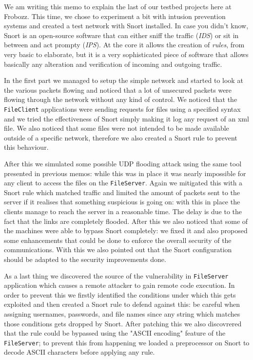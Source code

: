 \documentclass[paper=a4]{../../_global/texMemo}
\begin{document}
\maketitle

We am writing this memo to explain the last of our testbed projects here at Frobozz. This time, we chose to experiment a bit with intusion prevention systems and created a test network with Snort installed. In case you didn't know, Snort is an open-source software that can either sniff the traffic (\textit{IDS}) or sit in between and act prompty (\textit{IPS}). At the core it allows the creation of \textit{rules}, from very basic to elaborate, but it is a very sophisticated piece of software that allows basically any alteration and verification of incoming and outgoing traffic.

In the first part we managed to setup the simple network and started to look at the various packets flowing and noticed that a lot of unsecured packets were flowing through the network without any kind of control.
We noticed that the \texttt{FileClient} applications were sending requests for files using a specified syntax and we tried the effectiveness of Snort simply making it log any request of an xml file. We also noticed that some files were not intended to be made available outside of a specific network, therefore we also created a Snort rule to prevent this behaviour.

After this we simulated some possible UDP flooding attack using the same tool presented in previous memos: while this was in place it was nearly impossible for any client to access the files on the \texttt{FileServer}.
Again we mitigated this with a Snort rule which matched traffic and limited the amount of packets sent to the server if it realises that something suspicious is going on: with this in place the clients manage to reach the server in a reasonable time. The delay is due to the fact that the links are completely flooded.
After this we also noticed that some of the machines were able to bypass Snort completely: we fixed it and also proposed some enhancements that could be done to enforce the overall security of the communications. With this we also pointed out that the Snort configuration should be adapted to the security improvements done.

As a last thing we discovered the source of the vulnerability in \texttt{FileServer} application which causes a remote attacker to gain remote code execution. In order to prevent this we firstly identified the conditions under which this gets exploited and then created a Snort rule to defend against this: be careful when assigning usernames, passwords, and file names since any string which matches those conditions gets dropped by Snort.
After patching this we also discovrered that the rule could be bypassed using the "ASCII encoding" feature of the \texttt{FileServer}; to prevent this from happening we loaded a preprocessor on Snort to decode ASCII characters before applying any rule.
\end{document}

